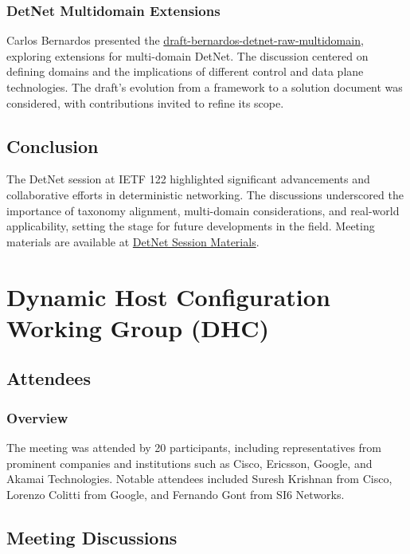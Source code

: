 \documentclass{article}
\begin{document}
\subsubsection{DetNet Multidomain Extensions}
Carlos Bernardos presented the \href{https://datatracker.ietf.org/doc/draft-bernardos-detnet-raw-multidomain/05}{draft-bernardos-detnet-raw-multidomain}, exploring extensions for multi-domain DetNet. The discussion centered on defining domains and the implications of different control and data plane technologies. The draft's evolution from a framework to a solution document was considered, with contributions invited to refine its scope.

\subsection{Conclusion}
The DetNet session at IETF 122 highlighted significant advancements and collaborative efforts in deterministic networking. The discussions underscored the importance of taxonomy alignment, multi-domain considerations, and real-world applicability, setting the stage for future developments in the field. Meeting materials are available at \href{https://datatracker.ietf.org/meeting/122/session/detnet}{DetNet Session Materials}.



\newpage

\section{Dynamic Host Configuration Working Group (DHC)}

\subsection{Attendees}
\subsubsection{Overview}
The meeting was attended by 20 participants, including representatives from prominent companies and institutions such as Cisco, Ericsson, Google, and Akamai Technologies. Notable attendees included Suresh Krishnan from Cisco, Lorenzo Colitti from Google, and Fernando Gont from SI6 Networks.

\subsection{Meeting Discussions}
\end{document}
